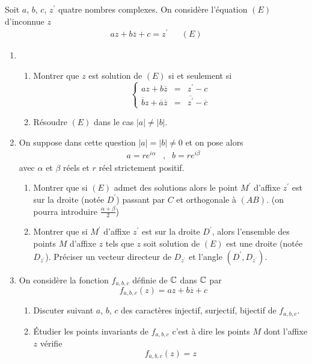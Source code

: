 Soit $a$, $b$, $c$, $z^\prime$ quatre nombres complexes. On considère l'équation $(E)$ d'inconnue $z$
\begin{align*}
 az+b\overline{z}+c = z^\prime & & (E)
\end{align*}
\begin{enumerate}
 \item \begin{enumerate}
 \item Montrer que $z$ est solution de $(E)$ si et seulement si
\begin{displaymath}
\left\lbrace 
\begin{array}{lll}
 az+b\overline{z} &=& z^\prime -c \\
 \overline{b}z + \overline{a}\overline{z} &=& \overline{z^\prime} - \overline{c}
\end{array}
\right. 
\end{displaymath}
\item Résoudre $(E)$ dans le cas $|a|\neq |b|$.
\end{enumerate}
\item On suppose dans cette question $|a|= |b|\neq 0$ et on pose alors
\begin{align*}
 a=re^{i\alpha} &, & b=re^{i\beta}
\end{align*}
avec $\alpha$ et $\beta$ réels et $r$ réel strictement positif.
\begin{enumerate}
 \item Montrer que si $(E)$ admet des solutions alors le point $M^\prime$ d'affixe $z^\prime$ est sur la droite (notée $D^\prime$) passant par $C$ et orthogonale à $(AB)$. \newline(on pourra introduire $\frac{\alpha + \beta}{2}$)
 \item Montrer que si $M^\prime$ d'affixe $z^\prime$ est sur la droite $D^\prime$, alors l'ensemble des points $M$ d'affixe $z$ tels que $z$ soit solution de $(E)$ est une droite (notée $D_{z^\prime}$). Préciser un vecteur directeur de $D_{z^\prime}$ et l'angle $(D^\prime,D_{z^\prime})$.
\end{enumerate}
\item On considère la fonction $f_{a,b,c}$ définie de $\mathbb{C}$ dans $\mathbb{C}$ par 
\begin{displaymath}
 f_{a,b,c}(z) = az + b\overline{z}+c
\end{displaymath}
\begin{enumerate}
 \item Discuter suivant $a$, $b$, $c$ des caractères injectif, surjectif, bijectif de $f_{a,b,c}$.
 \item \'Etudier les points invariants de $f_{a,b,c}$ c'est à dire les points $M$ dont l'affixe $z$ vérifie
\begin{displaymath}
 f_{a,b,c}(z)=z
\end{displaymath}

\end{enumerate}

\end{enumerate}
